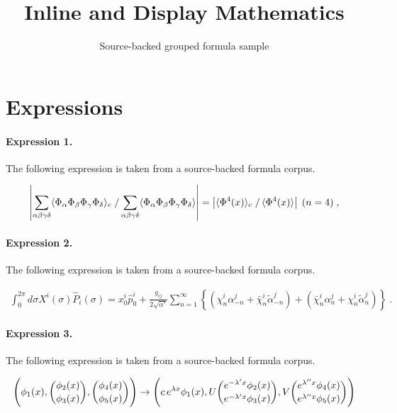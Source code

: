 \documentclass[11pt]{article}
\title{Inline and Display Mathematics}
\author{Source-backed grouped formula sample}
\date{}
\begin{document}
\maketitle
\section{Expressions}
\paragraph{Expression 1.} The following expression is taken from a source-backed formula corpus.

\begin{align*}\left| \sum_{\alpha \beta \gamma \delta}\langle \Phi_{\alpha} \Phi_{\beta} \Phi_{\gamma} \Phi_{\delta} \rangle_c\left. \right/ \sum_{\alpha \beta \gamma \delta}\langle \Phi_{\alpha} \Phi_{\beta} \Phi_{\gamma} \Phi_{\delta} \rangle\right|=\left| \langle \Phi^4(x) \rangle_c \left. \right/\langle \Phi^4(x) \rangle \right|\; (n=4) \; ,\end{align*}

\paragraph{Expression 2.} The following expression is taken from a source-backed formula corpus.

\begin{align*}\int^{2\pi}_{0} d\sigma X^{i}(\sigma)\hat{P}_{i}(\sigma) =x^{i}_{0}\hat{p}^{i}_{0} +\frac{g_{ij}}{2\sqrt{\alpha'}} \sum_{n=1}^{\infty}\left\{ \left( \chi_{n}^{i}\alpha^{j}_{-n} +\bar{\chi}^{i}_{n}\tilde{\alpha}^{j}_{-n} \right) +\left(\bar{\chi}_{n}^{i}\alpha^{j}_{n} +\chi_{n}^{i} \tilde{\alpha}^{j}_{n}\right) \right\}~.\end{align*}

\paragraph{Expression 3.} The following expression is taken from a source-backed formula corpus.

\begin{align*}\Biggl( \phi_1(x), {\phi_2(x)\choose\phi_3(x)},{\phi_4(x)\choose\phi_5(x)} \Biggr) \rightarrow \Biggl( c\, e\sp{\lambda x} \phi_1(x), U {e\sp{-\lambda\sp\prime x}\phi_2(x)\choose e\sp{-\lambda\sp\prime x}\phi_3(x)},V {e\sp{\lambda\sp{\prime\prime}x} \phi_4(x)\choose e\sp{\lambda\sp{\prime\prime}x} \phi_5(x)} \Biggr)\end{align*}
\end{document}
